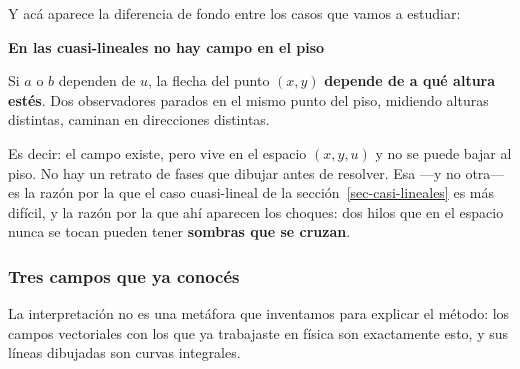 \documentclass[
  spanish,
  a4paper,
]{scrbook}
\theoremstyle{definition}
\theoremstyle{plain}
\theoremstyle{definition}
\theoremstyle{plain}
\theoremstyle{definition}
\theoremstyle{remark}
\begin{document}
Y acá aparece la diferencia de fondo entre los casos que vamos a
estudiar:

\begin{tcolorbox}[enhanced jigsaw, arc=.35mm, bottomrule=.15mm, breakable, colback=white, colframe=quarto-callout-warning-color-frame, left=2mm, leftrule=.75mm, opacityback=0, rightrule=.15mm, toprule=.15mm]
\begin{minipage}[t]{5.5mm}
\textcolor{quarto-callout-warning-color}{\faExclamationTriangle}
\end{minipage}%
\begin{minipage}[t]{\textwidth - 5.5mm}

\vspace{-3mm}\textbf{En las cuasi-lineales no hay campo en el piso}\vspace{3mm}

Si \(a\) o \(b\) dependen de \(u\), la flecha del punto \((x,y)\)
\textbf{depende de a qué altura estés}. Dos observadores parados en el
mismo punto del piso, midiendo alturas distintas, caminan en direcciones
distintas.

Es decir: el campo existe, pero vive en el espacio \((x,y,u)\) y no se
puede bajar al piso. No hay un retrato de fases que dibujar antes de
resolver. Esa ---y no otra--- es la razón por la que el caso
cuasi-lineal de la sección~\ref{sec-casi-lineales} es más difícil, y la
razón por la que ahí aparecen los choques: dos hilos que en el espacio
nunca se tocan pueden tener \textbf{sombras que se cruzan}.

\end{minipage}%
\end{tcolorbox}

\subsubsection{Tres campos que ya conocés}\label{sec-campos-fisicos}

La interpretación no es una metáfora que inventamos para explicar el
método: los campos vectoriales con los que ya trabajaste en física son
exactamente esto, y sus líneas dibujadas son curvas integrales.
\end{document}
